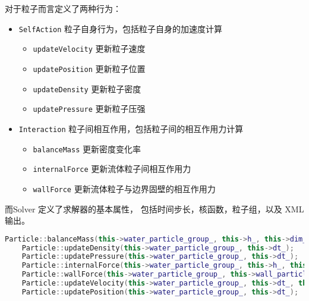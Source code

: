 \begin{frame}
    对于粒子而言定义了两种行为：
    \begin{itemize}
        \item \texttt{SelfAction} 粒子自身行为，包括粒子自身的加速度计算
        \begin{itemize}
            \item \texttt{updateVelocity} 更新粒子速度
            \item \texttt{updatePosition} 更新粒子位置
            \item \texttt{updateDensity} 更新粒子密度
            \item \texttt{updatePressure} 更新粒子压强
        \end{itemize}
        \item \texttt{Interaction} 粒子间相互作用，包括粒子间的相互作用力计算
        \begin{itemize}
            \item \texttt{balanceMass} 更新密度变化率
            \item \texttt{internalForce} 更新流体粒子间相互作用力
            \item \texttt{wallForce} 更新流体粒子与边界固壁的相互作用力
        \end{itemize}
    \end{itemize}

    而Solver 定义了求解器的基本属性，
    包括时间步长，核函数，粒子组，以及 XML 输出。

\end{frame}

\begin{lstlisting}[language=C++]
    Particle::balanceMass(this->water_particle_group_, this->h_, this->dim_);
    Particle::updateDensity(this->water_particle_group_, this->dt_);
    Particle::updatePressure(this->water_particle_group_, this->dt_);
    Particle::internalForce(this->water_particle_group_, this->h_, this->dim_);
    Particle::wallForce(this->water_particle_group_, this->wall_particle_group_, this->h_, this->dim_);
    Particle::updateVelocity(this->water_particle_group_, this->dt_, this->body_force_vec_);
    Particle::updatePosition(this->water_particle_group_, this->dt_);
\end{lstlisting}